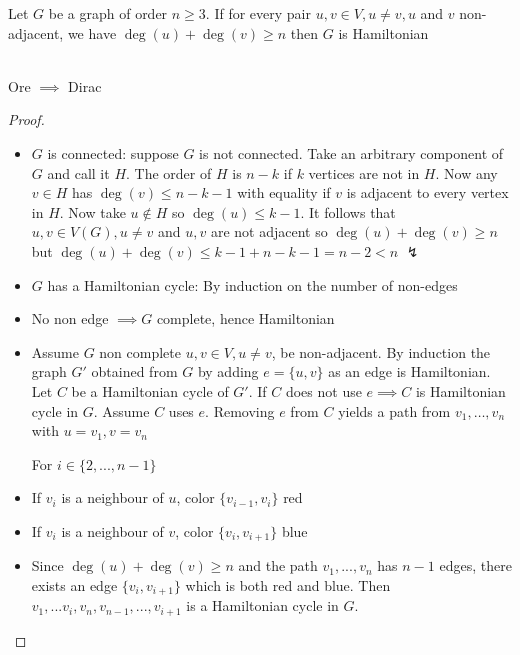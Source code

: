 \begin{theorem}
    Let $G$ be a graph of order $n\geq3$. If for every pair $u,v\in V,u\neq v,u$ and $v$ non-adjacent, we have $\deg(u)+\deg(v)\geq n$ then $G$ is Hamiltonian
\end{theorem}
\begin{remark}
\hfill \\
    Ore $\implies$ Dirac
\end{remark}
\begin{proof}
    \begin{itemize}
    \hfill \\
        \item $G$ is connected: suppose $G$ is not connected. Take an arbitrary component of $G$ and call it $H$. The order of $H$ is $n-k$ if $k$ vertices are not in $H$. Now any $v\in H$ has $\deg(v)\leq n-k-1$ with equality if $v$ is adjacent to every vertex in $H$. Now take $u\notin H$ so $\deg(u)\leq k-1$. It follows that $u,v\in V(G),u\neq v$ and $u,v$ are not adjacent so $\deg(u)+\deg(v)\geq n$ but $\deg(u)+\deg(v)\leq k-1+n-k-1=n-2<n$ $\lightning$
        \item $G$ has a Hamiltonian cycle: By induction on the number of non-edges
        \item No non edge $\implies G$ complete, hence Hamiltonian
        \item Assume $G$ non complete $u,v\in V, u\neq v$, be non-adjacent. By induction the graph $G'$ obtained from $G$ by adding $e=\{u,v\}$ as an edge is Hamiltonian. Let $C$ be a Hamiltonian cycle of $G'$. If $C$ does not use $e\implies C$ is Hamiltonian cycle in $G$. Assume $C$ uses $e$. Removing $e$ from $C$ yields a path from $v_1,\ldots ,v_n$ with $u=v_1,v=v_n$\par
        For $i\in\{2,...,n-1\}$
        \item If $v_i$ is a neighbour of $u$, color $\{v_{i-1},v_i\}$ red
        \item If $v_i$ is a neighbour of $v$, color $\{v_{i},v_{i+1}\}$ blue
        \item Since $\deg(u)+\deg(v)\geq n$ and the path $v_1,...,v_n$ has $n-1$ edges, there exists an edge $\{v_{i},v_{i+1}\}$ which is both red and blue. Then $v_1,...v_i,v_n,v_{n-1},...,v_{i+1}$ is a Hamiltonian cycle in $G$.
    \end{itemize}
    \begin{center}
\end{center}
\end{proof}
